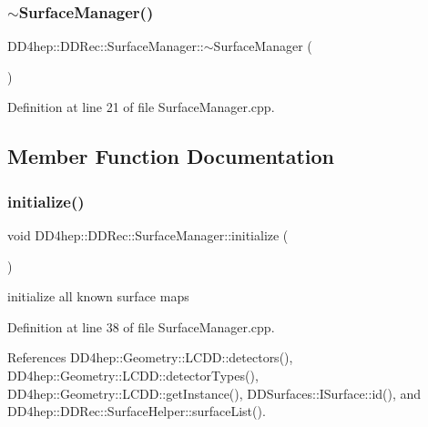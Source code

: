\subsubsection{\texorpdfstring{$\sim$\+Surface\+Manager()}{~SurfaceManager()}}
{\footnotesize\ttfamily D\+D4hep\+::\+D\+D\+Rec\+::\+Surface\+Manager\+::$\sim$\+Surface\+Manager (\begin{DoxyParamCaption}{ }\end{DoxyParamCaption})}



Definition at line 21 of file Surface\+Manager.\+cpp.



\subsection{Member Function Documentation}
\hypertarget{class_d_d4hep_1_1_d_d_rec_1_1_surface_manager_a418776e91006ad305f08e6bfde675ec9}{}\label{class_d_d4hep_1_1_d_d_rec_1_1_surface_manager_a418776e91006ad305f08e6bfde675ec9} 
\subsubsection{\texorpdfstring{initialize()}{initialize()}}
{\footnotesize\ttfamily void D\+D4hep\+::\+D\+D\+Rec\+::\+Surface\+Manager\+::initialize (\begin{DoxyParamCaption}{ }\end{DoxyParamCaption})\hspace{0.3cm}{\ttfamily [protected]}}



initialize all known surface maps 



Definition at line 38 of file Surface\+Manager.\+cpp.



References D\+D4hep\+::\+Geometry\+::\+L\+C\+D\+D\+::detectors(), D\+D4hep\+::\+Geometry\+::\+L\+C\+D\+D\+::detector\+Types(), D\+D4hep\+::\+Geometry\+::\+L\+C\+D\+D\+::get\+Instance(), D\+D\+Surfaces\+::\+I\+Surface\+::id(), and D\+D4hep\+::\+D\+D\+Rec\+::\+Surface\+Helper\+::surface\+List().

\hypertarget{class_d_d4hep_1_1_d_d_rec_1_1_surface_manager_a6ad4b9616553a050c273937767cea902}{}\label{class_d_d4hep_1_1_d_d_rec_1_1_surface_manager_a6ad4b9616553a050c273937767cea902} 
